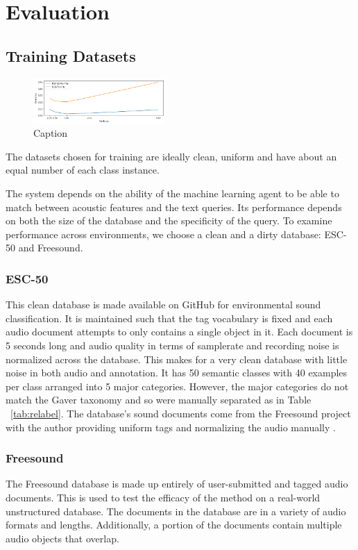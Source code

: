 \section{Evaluation}

\subsection{Training Datasets}
\begin{figure}
    \centering
    \includegraphics[width=0.45\textwidth]{figures/dataset-load-time.png}
    \caption{Caption}
    \label{fig:my_label}
\end{figure}

The datasets chosen for training are ideally clean, uniform and have about an equal number of each class instance. 

The system depends on the ability of the machine learning agent to be able to
match between acoustic features and the text queries. Its performance depends on
both the size of the database and the specificity of the query. To examine
performance across environments, we choose a clean and a dirty database: ESC-50
\cite{Piczak2015} and Freesound.

\subsubsection{ESC-50}
This clean database is made available on GitHub for environmental sound
classification. It is maintained such that the tag vocabulary is fixed and each
audio document attempts to only contains a single object in it. Each document is
5 seconds long and audio quality in terms of samplerate and recording noise is
normalized across the database. This makes for a very clean database with little
noise in both audio and annotation. It has 50 semantic classes with 40 examples
per class arranged into 5 major categories. However, the major categories do not
match the Gaver taxonomy and so were manually separated as in Table
~\ref{tab:relabel}. The database's sound documents come from the Freesound
project with the author providing uniform tags and normalizing the audio
manually \cite{Font2013}.

\subsubsection{Freesound}
The Freesound database is made up entirely of user-submitted and tagged audio documents. This is used to test the efficacy of the method on a real-world unstructured database. The documents in the database are in a variety of audio formats and lengths. Additionally, a portion of the documents contain multiple audio objects that overlap.

